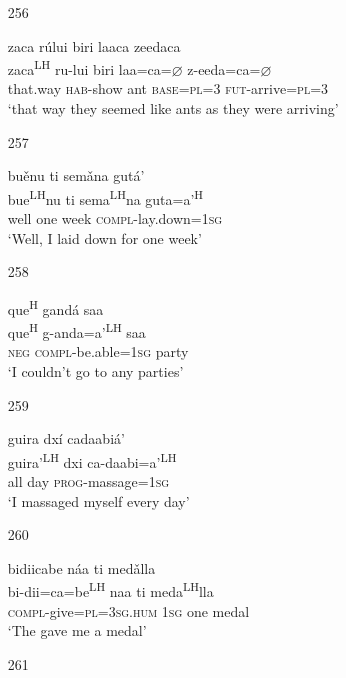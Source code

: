 \begin{itemize}
\item[256]
 
\glll   zaca r\'{u}lui biri laaca zeedaca \\
zaca\textsuperscript{LH} ru-lui biri laa=ca=$\varnothing$ z-eeda=ca=$\varnothing$ \\
that.way \textsc{hab}-show ant \textsc{base}=\textsc{pl}=\textsc{3} \textsc{fut}-arrive=\textsc{pl}=\textsc{3} \\
\glt `that way they seemed like ants as they were arriving'
 


\item[257]
 
\glll   bu\v{e}nu ti sem\v{a}na gut\'{a}' \\
 bue\textsuperscript{LH}nu ti sema\textsuperscript{LH}na guta=a'\textsuperscript{H} \\
 well one week \textsc{compl}-lay.down=\textsc{1sg} \\
\glt `Well, I laid down for one week'
 

\item[258]
 
\glll   que\textsuperscript{H} gand\'{a} saa \\
que\textsuperscript{H} g-anda=a'\textsuperscript{LH} saa \\
\textsc{neg} \textsc{compl}-be.able=\textsc{1sg} party \\
\glt `I couldn't go to any parties'
 


\item[259]
 
\glll   guira dx\'{i} cadaabi\'{a}' \\
guira'\textsuperscript{LH} dxi ca-daabi=a'\textsuperscript{LH} \\
all day \textsc{prog}-massage=\textsc{1sg} \\
\glt `I massaged myself every day'
 



\item[260]
 
\glll   bidiicabe n\'{a}a ti med\v{a}lla \\
bi-dii=ca=be\textsuperscript{LH} naa ti meda\textsuperscript{LH}lla \\
\textsc{compl}-give=\textsc{pl}=\textsc{3sg.hum} \textsc{1sg} one medal \\
\glt `The gave me a medal'
 



\item[261]
 

\end{itemize}
